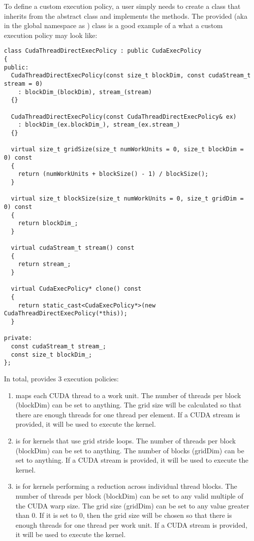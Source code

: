 To define a custom execution policy, a user simply needs to create a class that inherits from
the abstract class and implements the methods. The {\sundials} provided
 (aka in the global namespace as
) class is a good example of a what a custom execution policy
may look like:

\begin{verbatim}
class CudaThreadDirectExecPolicy : public CudaExecPolicy
{
public:
  CudaThreadDirectExecPolicy(const size_t blockDim, const cudaStream_t stream = 0)
    : blockDim_(blockDim), stream_(stream)
  {}

  CudaThreadDirectExecPolicy(const CudaThreadDirectExecPolicy& ex)
    : blockDim_(ex.blockDim_), stream_(ex.stream_)
  {} 

  virtual size_t gridSize(size_t numWorkUnits = 0, size_t blockDim = 0) const
  {
    return (numWorkUnits + blockSize() - 1) / blockSize();
  }

  virtual size_t blockSize(size_t numWorkUnits = 0, size_t gridDim = 0) const
  {
    return blockDim_;
  }

  virtual cudaStream_t stream() const
  {
    return stream_;
  }

  virtual CudaExecPolicy* clone() const
  {
    return static_cast<CudaExecPolicy*>(new CudaThreadDirectExecPolicy(*this));
  }

private:
  const cudaStream_t stream_;
  const size_t blockDim_;
};
\end{verbatim}

In total, {\sundials} provides 3 execution policies:

\begin{enumerate}
  \item {}
    maps each CUDA thread to a work unit. The number of threads per block (blockDim) can be set
    to anything. The grid size will be calculated so that there are enough threads for one
    thread per element. If a CUDA stream is provided, it will be used to execute the kernel.

  \item {}
    is for kernels that use grid stride loops. The number of threads per block (blockDim)
    can be set to anything. The number of blocks (gridDim) can be set to anything. If a
    CUDA stream is provided, it will be used to execute the kernel.

  \item {}
    is for kernels performing a reduction across individual thread blocks. The number of threads
    per block (blockDim) can be set to any valid multiple of the CUDA warp size. The grid size
    (gridDim) can be set to any value greater than 0. If it is set to 0, then the grid size
    will be chosen so that there is enough threads for one thread per work unit. If a
    CUDA stream is provided, it will be used to execute the kernel.
\end{enumerate}

